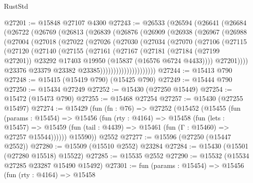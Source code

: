 \begin{lexlean}{RustStd}
\begin{coremodule}
{\begin{coremodule}
{{{{{{{{{{{{{{{{{{{{{{{{{{{{{{{{{{{{{{{{{{{{{{{{{{{{{{{{{{{{@27201 := @15848 @27107 @4300
@27243 := @26533
    (@26594
      (@26641
        (@26684
          (@26722
            (@26769
              (@26813
                (@26839
                  (@26876
                    (@26909
                      (@26938
                        (@26967
                          (@26988
                            (@27004
                              (@27018
                                (@27022
                                  (@27026
                                    (@27030
                                      (@27034
                                        (@27070
                                          (@27106
                                            (@27115
                                              (@27120
                                                (@27140
                                                  (@27155
                                                    (@27161
                                                      (@27167
                                                        (@27181
                                                          (@27184 (@27199 @27201))
                                                          @23292
                                                          @17403
                                                          @19950
                                                          (@15837 (@16576 @6724 @4433))))
                                                      @27201))))
                                              @23376
                                              @23379
                                              @23382
                                              @23385)))))))))))))))))))))
@27244 := @15413 @790
@27248 := @15415 (@15419 @790) (@15425 @790)
@27249 := @15444 @790
@27250 := @15434 @27249
@27252 := @15430 (@27250 @15449)
@27254 := @15472 (@15473 @790)
@27255 := @15468 @27254
@27257 := @15430 (@27255 @15497)
@27274 := @15429
    (fun (fn : @76) =>
    @27252
      (@15452
        (@15455
          (fun (params : @15454) =>
          @15456
            (fun (rty : @4164) =>
            @15458
              (fun (lets : @15457) =>
              @15459 (fun (tail : @4439) => @15461 (fun (Γ : @15460) => @27257 @15544))))))
        @15590))
    @2552
@27277 := @15596 (@27250 (@15447 @2552))
@27280 := @15509 (@15510 @2552) @23284
@27284 := @15430 (@15501 (@27280 @15518) @15522)
@27285 := @15535 @2552
@27290 := @15532 (@15534 @27285 @23287 @15490 @15492)
@27301 := fun (params : @15454) =>
  @15456
    (fun (rty : @4164) =>
    @15458
}}}}}}}}}}}}}}}}}}}}}}}}}}}}}}}}}}}}}}}}}}}}}}}}}}}}}}}}}}}}
\end{coremodule}}
\end{coremodule}
\end{lexlean}
